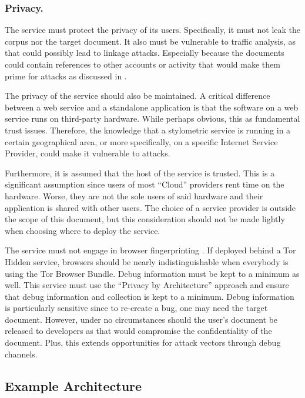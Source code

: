 \documentclass[letterpaper]{article}
\begin{document}
\subsubsection{Privacy.}

The service must protect the privacy of its users.  Specifically, it
must not leak the corpus nor the target document.  It also must be
vulnerable to traffic analysis, as that could possibly lead to linkage
attacks.  Especially because the documents could contain references to
other accounts or activity that would make them prime for attacks as
discussed in \cite{Narayanan:2008:RDL:1397759.1398064}.

The privacy of the service should also be maintained.  A critical
difference between a web service and a standalone application is that
the software on a web service runs on third-party hardware.  While
perhaps obvious, this as fundamental trust issues.  Therefore, the
knowledge that a stylometric service is running in a certain
geographical area, or more specifically, on a specific Internet
Service Provider, could make it vulnerable to attacks.

Furthermore, it is assumed that the host of the service is trusted.
This is a significant assumption since users of most ``Cloud''
providers rent time on the hardware.  Worse, they are not the sole
users of said hardware and their application is shared with other
users.  The choice of a service provider is outside the scope of this
document, but this consideration should not be made lightly when
choosing where to deploy the service.

The service must not engage in browser fingerprinting
\cite{Eckersley:2010:UYW:1881151.1881152}.  If deployed behind a Tor
Hidden service, browsers should be nearly indistinguishable when
everybody is using the Tor Browser Bundle.  Debug information must be
kept to a minimum as well.  This service must use the ``Privacy by
Architecture'' approach \cite{Spiekermann_Cranor:2009} and ensure that
debug information and collection is kept to a minimum.  Debug
information is particularly sensitive since to re-create a bug, one
may need the target document.  However, under no circumstances should
the user's document be released to developers as that would compromise
the confidentiality of the document.  Plus, this extends opportunities
for attack vectors through debug channels.

\subsection{Example Architecture}
\end{document}
